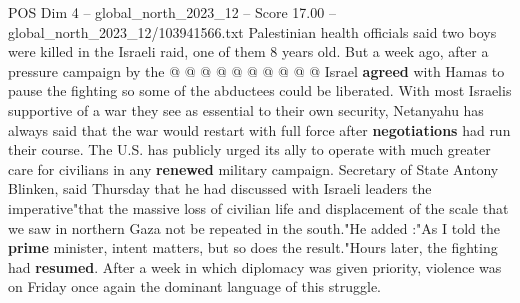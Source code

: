 \begin{textsample}{POS Dim 4 – global\_north\_2023\_12 – Score 17.00 – global\_north\_2023\_12/103941566.txt}
Palestinian health officials said two boys were killed in the Israeli raid, one of them 8 years old.
But a week ago, after a pressure campaign by the @ @ @ @ @ @ @ @ @ @ Israel \textbf{agreed} with Hamas to pause the fighting so some of the abductees could be liberated.
With most Israelis supportive of a war they see as essential to their own security, Netanyahu has always said that the war would restart with full force after \textbf{negotiations} had run their course.
The U.S. has publicly urged its ally to operate with much greater care for civilians in any \textbf{renewed} military campaign.
Secretary of State Antony Blinken, said Thursday that he had discussed with Israeli leaders the imperative"that the massive loss of civilian life and displacement of the scale that we saw in northern Gaza not be repeated in the south."He added :"As I told the \textbf{prime} minister, intent matters, but so does the result."Hours later, the fighting had \textbf{resumed}.
After a week in which diplomacy was given priority, violence was on Friday once again the dominant language of this struggle.

\end{textsample}

